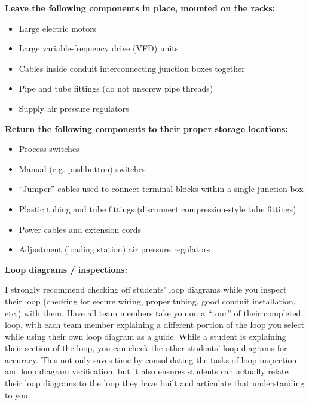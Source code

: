\vskip 10pt

\indent
{\bf Leave the following components in place, mounted on the racks:}

\begin{itemize}
\item{} Large electric motors
\item{} Large variable-frequency drive (VFD) units
\item{} Cables inside conduit interconnecting junction boxes together
\item{} Pipe and tube fittings (do not unscrew pipe threads)
\item{} Supply air pressure regulators
\end{itemize}

\vskip 10pt

\indent
{\bf Return the following components to their proper storage locations:}

\begin{itemize}
\item{} Process switches
\item{} Manual (e.g. pushbutton) switches
\item{} ``Jumper'' cables used to connect terminal blocks within a single junction box
\item{} Plastic tubing and tube fittings (disconnect compression-style tube fittings)
\item{} Power cables and extension cords
\item{} Adjustment (loading station) air pressure regulators
\end{itemize}
















\noindent
{\bf Loop diagrams / inspections:}

I strongly recommend checking off students' loop diagrams while you inspect their loop (checking for secure wiring, proper tubing, good conduit installation, etc.) with them.  Have all team members take you on a ``tour'' of their completed loop, with each team member explaining a different portion of the loop you select while using their own loop diagram as a guide.  While a student is explaining their section of the loop, you can check the other students' loop diagrams for accuracy.  This not only saves time by consolidating the tasks of loop inspection and loop diagram verification, but it also ensures students can actually relate their loop diagrams to the loop they have built and articulate that understanding to you.

